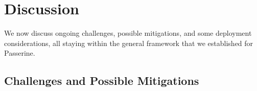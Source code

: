 \section{Discussion}




We now discuss ongoing challenges, possible mitigations, and some deployment considerations, all staying within the general framework that we established for Passerine.









   





\subsection{Challenges and Possible Mitigations}\label{sec:challenges}

